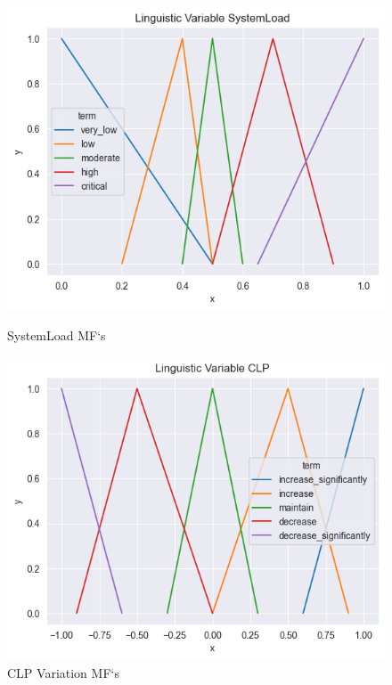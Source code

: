 \documentclass[titlepage]{article}
\begin{document}
\begin{figure}[htbp]
    \centering
    \begin{minipage}{0.45\textwidth}
        \centering
        \includegraphics[width=\textwidth]{../images/triangular_v4_SystemLoad}
        \caption{SystemLoad MF`s}
        \label{fig:systemload_triangular_v4}
    \end{minipage}
    \hfill
    \begin{minipage}{0.45\textwidth}
        \centering
        \includegraphics[width=\textwidth]{../images/triangular_v4_CLP}
        \caption{CLP Variation MF`s}
        \label{fig:clp_triangular_v4}
    \end{minipage}
\end{figure}
\end{document}

